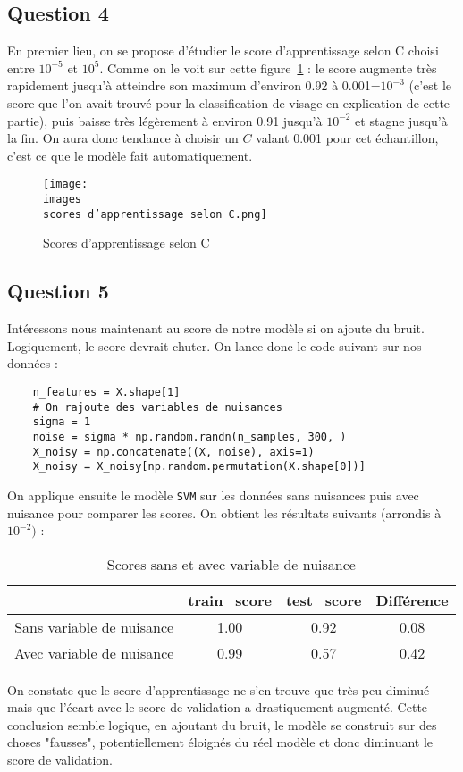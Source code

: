 \documentclass[11pt,a4paper]{article}
\begin{document}
\subsection*{Question 4}
En premier lieu, on se propose d'étudier le score d'apprentissage selon C choisi entre $10^{-5}$ et $10^{5}$. Comme on le voit sur cette figure~\ref{scores-selon-C} : le score augmente très rapidement jusqu'à atteindre son maximum d'environ 0.92 à 0.001=$10^{-3}$ (c'est le score que l'on avait trouvé pour la classification de visage en explication de cette partie), puis baisse très légèrement à environ 0.91 jusqu'à $10^{-2}$ et stagne jusqu'à la fin. On aura donc tendance à choisir un $C$ valant 0.001 pour cet échantillon, c'est ce que le modèle fait automatiquement.
\begin{figure}[H]
    \centering
    \texttt{[image: \\images\\scores d'apprentissage selon C.png]}
    \caption{Scores d'apprentissage selon C}
    \label{scores-selon-C}
\end{figure}

\subsection*{Question 5}
Intéressons nous maintenant au score de notre modèle si on ajoute du bruit. Logiquement, le score devrait chuter. On lance donc le code suivant sur nos données :
\begin{verbatim}
    n_features = X.shape[1]
    # On rajoute des variables de nuisances
    sigma = 1
    noise = sigma * np.random.randn(n_samples, 300, )
    X_noisy = np.concatenate((X, noise), axis=1)
    X_noisy = X_noisy[np.random.permutation(X.shape[0])]
\end{verbatim}
On applique ensuite le modèle \texttt{SVM} sur les données sans nuisances puis avec nuisance pour comparer les scores. On obtient les résultats suivants (arrondis à $10^{-2})$ :
\begin{table}[H]
    \centering
    \begin{tabular}{|c|c|c|c|}
        \hline
        & train\_score & test\_score & Différence \\ 
        \hline
        Sans variable de nuisance & 1.00 & 0.92 & 0.08 \\
        \hline
        Avec variable de nuisance & 0.99 & 0.57 & 0.42 \\
        \hline
    \end{tabular}
    \caption{Scores sans et avec variable de nuisance}
    \label{Scores bruit}
\end{table}
On constate que le score d'apprentissage ne s'en trouve que très peu diminué mais que l'écart avec le score de validation a drastiquement augmenté. Cette conclusion semble logique, en ajoutant du bruit, le modèle se construit sur des choses "fausses", potentiellement éloignés du réel modèle et donc diminuant le score de validation.\\
\end{document}
